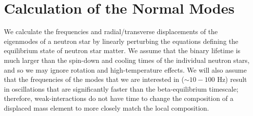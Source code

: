 \documentclass[fleqn,usenatbib]{mnras}
\begin{document}
\section{Calculation of the Normal Modes}
\hspace{\parindent}We calculate the frequencies and radial/transverse displacements of the eigenmodes of a neutron star by linearly perturbing the equations defining the equilibrium state of neutron star matter. We assume that the binary lifetime is much larger than the spin-down and cooling times of the individual neutron stars, and so we may ignore rotation and high-temperature effects. We will also assume that the frequencies of the modes that we are interested in ($\sim 10 - 100$ Hz) result in oscillations that are significantly faster than the beta-equilibrium timescale; therefore, weak-interactions do not have time to change the composition of a displaced mass element to more closely match the local composition.
\end{document}
